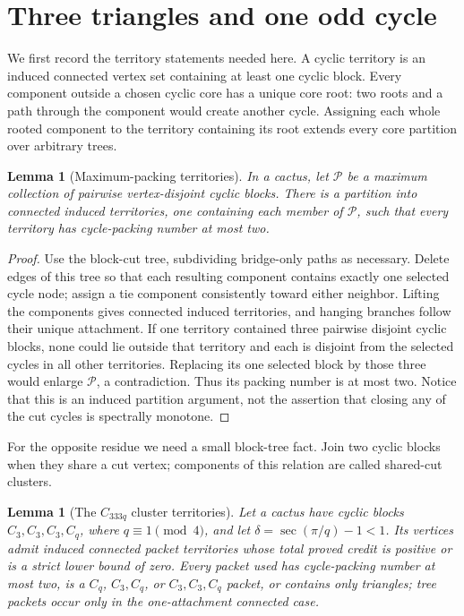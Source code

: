 \documentclass[11pt]{article}
\newtheorem{lemma}[theorem]{Lemma}
\theoremstyle{remark}
\begin{document}
\section{Three triangles and one odd cycle}

We first record the territory statements needed here.  A cyclic territory is
an induced connected vertex set containing at least one cyclic block.  Every
component outside a chosen cyclic core has a unique core root: two roots and a
path through the component would create another cycle.  Assigning each whole
rooted component to the territory containing its root extends every core
partition over arbitrary trees.

\begin{lemma}[Maximum-packing territories]\label{lem:maxterritory}
In a cactus, let $\mathcal P$ be a maximum collection of pairwise
vertex-disjoint cyclic blocks.  There is a partition into connected induced
territories, one containing each member of $\mathcal P$, such that every
territory has cycle-packing number at most two.
\end{lemma}

\begin{proof}
Use the block-cut tree, subdividing bridge-only paths as necessary.  Delete
edges of this tree so that each resulting component contains exactly one
selected cycle node; assign a tie component consistently toward either
neighbor.  Lifting the components gives connected induced territories, and
hanging branches follow their unique attachment.  If one territory contained
three pairwise disjoint cyclic blocks, none could lie outside that territory
and each is disjoint from the selected cycles in all other territories.
Replacing its one selected block by those three would enlarge $\mathcal P$,
a contradiction.  Thus its packing number is at most two.  Notice that this
is an induced partition argument, not the assertion that closing any of the
cut cycles is spectrally monotone.
\end{proof}

For the opposite residue we need a small block-tree fact.  Join two cyclic
blocks when they share a cut vertex; components of this relation are called
shared-cut clusters.

\begin{lemma}[The $C_{333q}$ cluster territories]\label{lem:333qterritory}
Let a cactus have cyclic blocks $C_3,C_3,C_3,C_q$, where
$q\equiv1\pmod4$, and let $\delta=\sec(\pi/q)-1<1$.
Its vertices admit induced connected packet territories whose total proved
credit is positive or is a strict lower bound of zero.  Every packet used has
cycle-packing number at most two, is a $C_q$, $C_3,C_q$, or
$C_3,C_3,C_q$ packet, or contains only triangles; tree packets occur only in
the one-attachment connected case.
\end{lemma}
\end{document}
